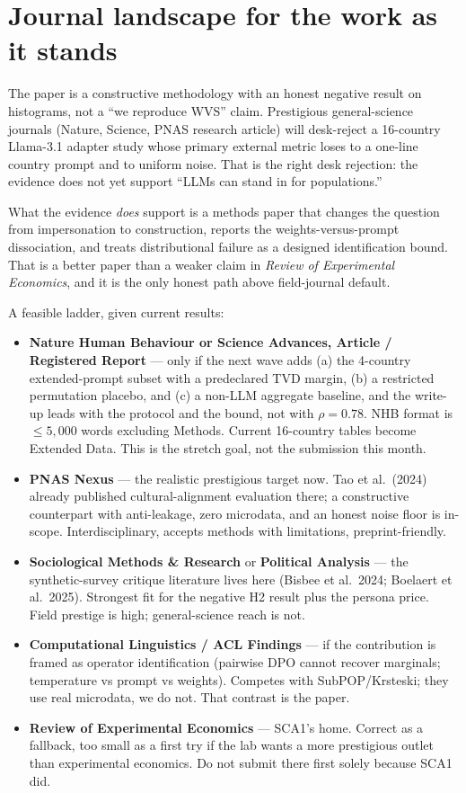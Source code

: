 \documentclass[11pt]{article}
\begin{document}
\section{Journal landscape for the work as it stands}
\label{sec:journals}
The paper is a constructive methodology with an honest negative result on histograms, not a ``we reproduce WVS'' claim. Prestigious general-science journals (Nature, Science, PNAS research article) will desk-reject a 16-country Llama-3.1 adapter study whose primary external metric loses to a one-line country prompt and to uniform noise. That is the right desk rejection: the evidence does not yet support ``LLMs can stand in for populations.''

What the evidence \emph{does} support is a methods paper that changes the question from impersonation to construction, reports the weights-versus-prompt dissociation, and treats distributional failure as a designed identification bound. That is a better paper than a weaker claim in \emph{Review of Experimental Economics}, and it is the only honest path above field-journal default.

A feasible ladder, given current results:

\begin{itemize}
\item \textbf{Nature Human Behaviour or Science Advances, Article / Registered Report} --- only if the next wave adds (a) the 4-country extended-prompt subset with a predeclared TVD margin, (b) a restricted permutation placebo, and (c) a non-LLM aggregate baseline, and the write-up leads with the protocol and the bound, not with $\rho=0.78$. NHB format is $\le 5{,}000$ words excluding Methods. Current 16-country tables become Extended Data. This is the stretch goal, not the submission this month.
\item \textbf{PNAS Nexus} --- the realistic prestigious target now. Tao et al.\ (2024) already published cultural-alignment evaluation there; a constructive counterpart with anti-leakage, zero microdata, and an honest noise floor is in-scope. Interdisciplinary, accepts methods with limitations, preprint-friendly.
\item \textbf{Sociological Methods \& Research} or \textbf{Political Analysis} --- the synthetic-survey critique literature lives here (Bisbee et al.\ 2024; Boelaert et al.\ 2025). Strongest fit for the negative H2 result plus the persona price. Field prestige is high; general-science reach is not.
\item \textbf{Computational Linguistics / ACL Findings} --- if the contribution is framed as operator identification (pairwise DPO cannot recover marginals; temperature vs prompt vs weights). Competes with SubPOP/Krsteski; they use real microdata, we do not. That contrast is the paper.
\item \textbf{Review of Experimental Economics} --- SCA1's home. Correct as a fallback, too small as a first try if the lab wants a more prestigious outlet than experimental economics. Do not submit there first solely because SCA1 did.
\end{itemize}
\end{document}
